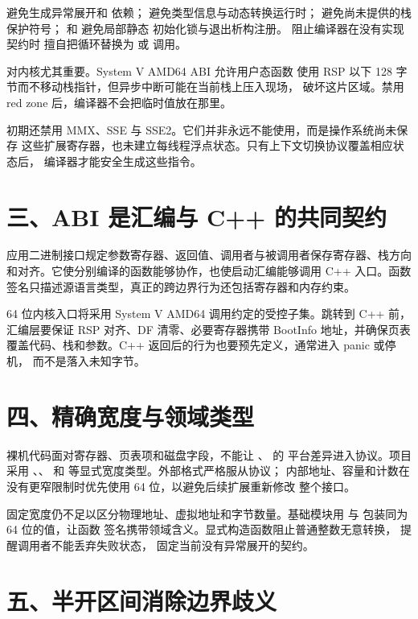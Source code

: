  避免生成异常展开和  依赖；
 避免类型信息与动态转换运行时；
 避免尚未提供的栈保护符号；
 和  避免局部静态
初始化锁与退出析构注册。 阻止编译器在没有实现契约时
擅自把循环替换为  或  调用。

 对内核尤其重要。System V AMD64 ABI 允许用户态函数
使用 RSP 以下 128 字节而不移动栈指针，但异步中断可能在当前栈上压入现场，
破坏这片区域。禁用 red zone 后，编译器不会把临时值放在那里。

初期还禁用 MMX、SSE 与 SSE2。它们并非永远不能使用，而是操作系统尚未保存
这些扩展寄存器，也未建立每线程浮点状态。只有上下文切换协议覆盖相应状态后，
编译器才能安全生成这些指令。

\section{三、ABI 是汇编与 C++ 的共同契约}

应用二进制接口规定参数寄存器、返回值、调用者与被调用者保存寄存器、栈方向
和对齐。它使分别编译的函数能够协作，也使启动汇编能够调用 C++ 入口。函数
签名只描述源语言类型，真正的跨边界行为还包括寄存器和内存约束。

64 位内核入口将采用 System V AMD64 调用约定的受控子集。跳转到 C++ 前，
汇编层要保证 RSP 对齐、DF 清零、必要寄存器携带 BootInfo 地址，并确保页表
覆盖代码、栈和参数。C++ 返回后的行为也要预先定义，通常进入 panic 或停机，
而不是落入未知字节。

\section{四、精确宽度与领域类型}

裸机代码面对寄存器、页表项和磁盘字段，不能让 、 的
平台差异进入协议。项目采用 、、
 和  等显式宽度类型。外部格式严格服从协议；
内部地址、容量和计数在没有更窄限制时优先使用 64 位，以避免后续扩展重新修改
整个接口。

固定宽度仍不足以区分物理地址、虚拟地址和字节数量。基础模块用
 与  包装同为 64 位的值，让函数
签名携带领域含义。显式构造函数阻止普通整数无意转换，\code{[[nodiscard]]}
提醒调用者不能丢弃失败状态， 固定当前没有异常展开的契约。

\section{五、半开区间消除边界歧义}


